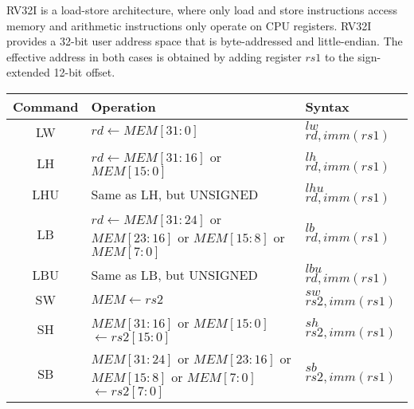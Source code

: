 	
	RV32I is a load-store architecture, where only load and store instructions access memory and arithmetic instructions only operate on CPU registers. RV32I provides a 32-bit user address space that is byte-addressed and little-endian.
	The effective address in both cases is obtained by adding register $rs1$ to the sign-extended 12-bit offset.\vspace{3mm}
	
		\begin{threeparttable}
		
		\begin{tabular}{|c|p{3in}|p{1in}|} \hline
			
			\setrow{\bfseries}Command &\setrow{\bfseries} Operation &\setrow{\bfseries} Syntax 					 		 \\\hline
			\cellcolor{brightgreen} LW & {\small $rd\leftarrow MEM[31:0]$} & {\small $lw$ $rd,imm(rs1)$}		         \\\hline
			\cellcolor{brightgreen} LH & {\small $rd\leftarrow MEM[31:16]$ or $MEM[15:0]$} & {\small $lh$ $rd,imm(rs1)$} \\\hline
			\cellcolor{brightgreen} LHU &{\small Same as LH, but UNSIGNED} & {\small $lhu$ $rd,imm(rs1)$}                \\\hline
			\cellcolor{brightgreen} LB & {\footnotesize $rd\leftarrow MEM[31:24]$ or $MEM[23:16]$ or $MEM[15:8]$ or $MEM[7:0]$}
			& {\small $lb$ $rd,imm(rs1)$}                                                                                \\\hline
			\cellcolor{brightgreen} LBU &{\small Same as LB, but UNSIGNED} & {\small $lbu$ $rd,imm(rs1)$}                \\\hline
			\cellcolor{capri!75} SW & {\small $MEM\leftarrow rs2$} & {\small $sw$ $rs2,imm(rs1)$}                        \\\hline
			\cellcolor{capri!75} SH & {\small $MEM[31:16]$ or $MEM[15:0]$ $\leftarrow rs2[15:0]$} &{\small $sh$ $rs2,imm(rs1)$}                                                                                              \\\hline
			\cellcolor{capri!75} SB & {\footnotesize $MEM[31:24]$ or $MEM[23:16]$ or $MEM[15:8]$ or $MEM[7:0]$ $\leftarrow rs2[7:0]$}
			& {\small $sb$ $rs2,imm(rs1)$}                                                                               \\\hline
			
		\end{tabular}
		
		\begin{tablenotes}
			

\end{tablenotes}
\end{threeparttable}
